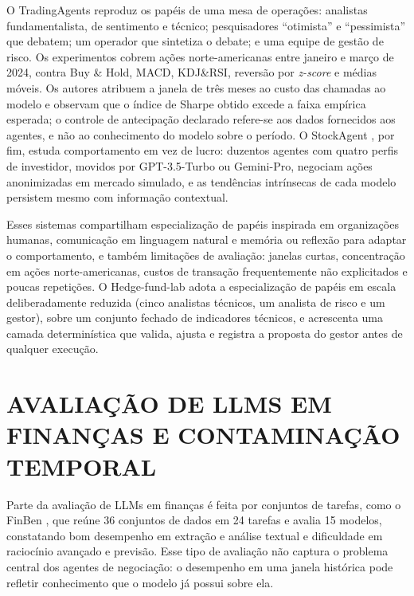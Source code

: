 \documentclass{eic-bcc-tcc}
\begin{document}
O TradingAgents \citep{TradingAgents2024} reproduz os papéis de uma mesa de operações: analistas fundamentalista, de sentimento e técnico; pesquisadores ``otimista'' e ``pessimista'' que debatem; um operador que sintetiza o debate; e uma equipe de gestão de risco. Os experimentos cobrem ações norte-americanas entre janeiro e março de 2024, contra Buy \& Hold, MACD, KDJ\&RSI, reversão por \textit{z-score} e médias móveis. Os autores atribuem a janela de três meses ao custo das chamadas ao modelo e observam que o índice de Sharpe obtido excede a faixa empírica esperada; o controle de antecipação declarado refere-se aos dados fornecidos aos agentes, e não ao conhecimento do modelo sobre o período. O StockAgent \citep{StockAgent2024}, por fim, estuda comportamento em vez de lucro: duzentos agentes com quatro perfis de investidor, movidos por GPT-3.5-Turbo ou Gemini-Pro, negociam ações anonimizadas em mercado simulado, e as tendências intrínsecas de cada modelo persistem mesmo com informação contextual.

Esses sistemas compartilham especialização de papéis inspirada em organizações humanas, comunicação em linguagem natural e memória ou reflexão para adaptar o comportamento, e também limitações de avaliação: janelas curtas, concentração em ações norte-americanas, custos de transação frequentemente não explicitados e poucas repetições. O Hedge-fund-lab adota a especialização de papéis em escala deliberadamente reduzida (cinco analistas técnicos, um analista de risco e um gestor), sobre um conjunto fechado de indicadores técnicos, e acrescenta uma camada determinística que valida, ajusta e registra a proposta do gestor antes de qualquer execução.

\section{AVALIAÇÃO DE LLMS EM FINANÇAS E CONTAMINAÇÃO TEMPORAL}
\label{sec:rel-avaliacao}

Parte da avaliação de LLMs em finanças é feita por conjuntos de tarefas, como o FinBen \citep{FinBen2024}, que reúne 36 conjuntos de dados em 24 tarefas e avalia 15 modelos, constatando bom desempenho em extração e análise textual e dificuldade em raciocínio avançado e previsão. Esse tipo de avaliação não captura o problema central dos agentes de negociação: o desempenho em uma janela histórica pode refletir conhecimento que o modelo já possui sobre ela.
\end{document}
